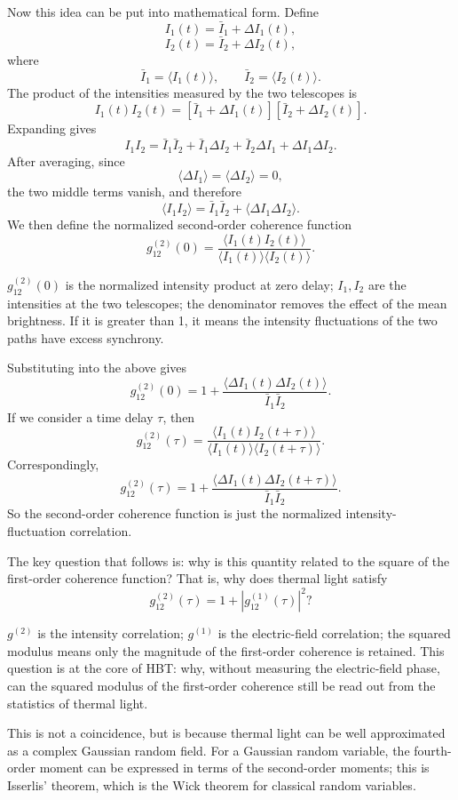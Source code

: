Now this idea can be put into mathematical form. Define
\[
  I_1(t)=\bar I_1+\Delta I_1(t),
\]
\[
  I_2(t)=\bar I_2+\Delta I_2(t),
\]
where
\[
  \bar I_1=\langle I_1(t)\rangle,\qquad
  \bar I_2=\langle I_2(t)\rangle.
\]
The product of the intensities measured by the two telescopes is
\[
  I_1(t)I_2(t)
  =
  [\bar I_1+\Delta I_1(t)]
  [\bar I_2+\Delta I_2(t)].
\]
Expanding gives
\[
  I_1I_2
  =
  \bar I_1\bar I_2
  +
  \bar I_1\Delta I_2
  +
  \bar I_2\Delta I_1
  +
  \Delta I_1\Delta I_2.
\]
After averaging, since
\[
  \langle \Delta I_1\rangle=
  \langle \Delta I_2\rangle=0,
\]
the two middle terms vanish, and therefore
\[
  \langle I_1I_2\rangle
  =
  \bar I_1\bar I_2+
  \langle \Delta I_1\Delta I_2\rangle.
\]
We then define the normalized second-order coherence function
\[
  g^{(2)}_{12}(0)
  =
  \frac{
    \langle I_1(t)I_2(t)\rangle
  }{
    \langle I_1(t)\rangle
    \langle I_2(t)\rangle
  }.
\]
\begin{formulaexplain}
\(g^{(2)}_{12}(0)\) is the normalized intensity product at zero delay; \(I_1,I_2\) are the intensities at the two telescopes; the denominator removes the effect of the mean brightness. If it is greater than 1, it means the intensity fluctuations of the two paths have excess synchrony.
\end{formulaexplain}
Substituting into the above gives
\[
  g^{(2)}_{12}(0)
  =
  1+
  \frac{
    \langle \Delta I_1(t)\Delta I_2(t)\rangle
  }{
    \bar I_1\bar I_2
  }.
\]
If we consider a time delay \(\tau\), then
\[
  g^{(2)}_{12}(\tau)
  =
  \frac{
    \langle I_1(t)I_2(t+\tau)\rangle
  }{
    \langle I_1(t)\rangle
    \langle I_2(t+\tau)\rangle
  }.
\]
Correspondingly,
\[
  g^{(2)}_{12}(\tau)
  =
  1+
  \frac{
    \langle \Delta I_1(t)\Delta I_2(t+\tau)\rangle
  }{
    \bar I_1\bar I_2
  }.
\]
So the second-order coherence function is just the normalized intensity-fluctuation correlation.

The key question that follows is: why is this quantity related to the square of the first-order coherence function? That is, why does thermal light satisfy
\[
  g^{(2)}_{12}(\tau)=1+\left|g^{(1)}_{12}(\tau)\right|^2?
\]
\begin{formulaexplain}
\(g^{(2)}\) is the intensity correlation; \(g^{(1)}\) is the electric-field correlation; the squared modulus means only the magnitude of the first-order coherence is retained. This question is at the core of HBT: why, without measuring the electric-field phase, can the squared modulus of the first-order coherence still be read out from the statistics of thermal light.
\end{formulaexplain}
This is not a coincidence, but is because thermal light can be well approximated as a complex Gaussian random field. For a Gaussian random variable, the fourth-order moment can be expressed in terms of the second-order moments; this is Isserlis' theorem, which is the Wick theorem for classical random variables.

